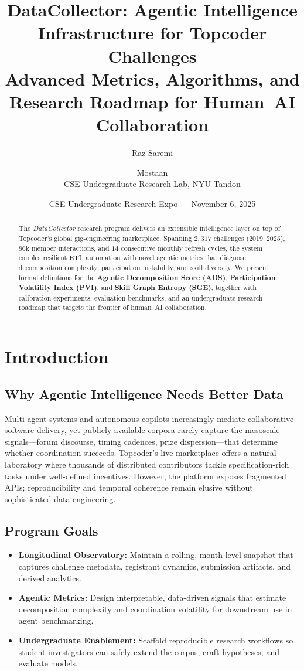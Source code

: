 \documentclass[11pt]{article}
\title{\textbf{DataCollector: Agentic Intelligence Infrastructure for Topcoder Challenges}\\
\large Advanced Metrics, Algorithms, and Research Roadmap for Human--AI Collaboration}
\author{Raz Saremi \and Mostaan \\ CSE Undergraduate Research Lab, NYU Tandon}
\date{CSE Undergraduate Research Expo --- November 6, 2025}
\begin{document}
\maketitle
\tableofcontents
\clearpage

\begin{abstract}
The \emph{DataCollector} research program delivers an extensible intelligence layer on top of Topcoder's global gig-engineering marketplace.
Spanning $2{,}317$ challenges (2019--2025), $86$k member interactions, and $14$ consecutive monthly refresh cycles, the system couples resilient ETL automation with novel agentic metrics that diagnose decomposition complexity, participation instability, and skill diversity.
We present formal definitions for the \textbf{Agentic Decomposition Score (ADS)}, \textbf{Participation Volatility Index (PVI)}, and \textbf{Skill Graph Entropy (SGE)}, together with calibration experiments, evaluation benchmarks, and an undergraduate research roadmap that targets the frontier of human--AI collaboration.
\end{abstract}

\section{Introduction}
\subsection{Why Agentic Intelligence Needs Better Data}
Multi-agent systems and autonomous copilots increasingly mediate collaborative software delivery, yet publicly available corpora rarely capture the mesoscale signals---forum discourse, timing cadences, prize dispersion---that determine whether coordination succeeds.
Topcoder's live marketplace offers a natural laboratory where thousands of distributed contributors tackle specification-rich tasks under well-defined incentives.
However, the platform exposes fragmented APIs; reproducibility and temporal coherence remain elusive without sophisticated data engineering.

\subsection{Program Goals}
\begin{itemize}[leftmargin=*]
  \item \textbf{Longitudinal Observatory:} Maintain a rolling, month-level snapshot that captures challenge metadata, registrant dynamics, submission artifacts, and derived analytics.
  \item \textbf{Agentic Metrics:} Design interpretable, data-driven signals that estimate decomposition complexity and coordination volatility for downstream use in agent benchmarking.
  \item \textbf{Undergraduate Enablement:} Scaffold reproducible research workflows so student investigators can safely extend the corpus, craft hypotheses, and evaluate models.
\end{itemize}
\end{document}
